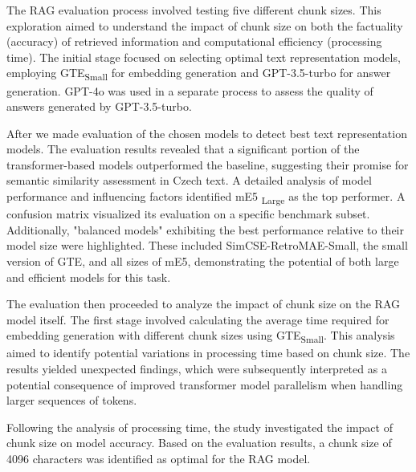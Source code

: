 The \ac{RAG} evaluation process involved testing five different chunk sizes.
This exploration aimed to understand the impact of chunk size on both the factuality (accuracy) of retrieved information and computational efficiency (processing time).
The initial stage focused on selecting optimal text representation models, employing \ac{GTE}\textsubscript{Small} for embedding generation and GPT-3.5-turbo for answer generation.
GPT-4o was used in a separate process to assess the quality of answers generated by GPT-3.5-turbo.

After we made evaluation of the chosen models to detect best text representation models.
The evaluation results revealed that a significant portion of the transformer-based models outperformed the baseline, suggesting their promise for semantic similarity assessment in Czech text.
A detailed analysis of model performance and influencing factors identified \ac{mE5} \textsubscript{Large} as the top performer.
A confusion matrix visualized its evaluation on a specific benchmark subset.
Additionally, "balanced models" exhibiting the best performance relative to their model size were highlighted.
These included SimCSE-RetroMAE-Small, the small version of \ac{GTE}, and all sizes of \ac{mE5}, demonstrating the potential of both large and efficient models for this task.

The evaluation then proceeded to analyze the impact of chunk size on the \ac{RAG} model itself.
The first stage involved calculating the average time required for embedding generation with different chunk sizes using \ac{GTE}\textsubscript{Small}.
This analysis aimed to identify potential variations in processing time based on chunk size.
The results yielded unexpected findings, which were subsequently interpreted as a potential consequence of improved transformer model parallelism when handling larger sequences of tokens.

Following the analysis of processing time, the study investigated the impact of chunk size on model accuracy.
Based on the evaluation results, a chunk size of 4096 characters was identified as optimal for the \ac{RAG} model.


